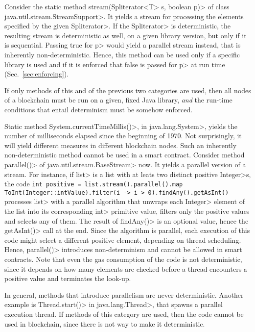 Consider the static method
\<stream(Spliterator$\text{<}$T$\text{>}$ s, boolean p)>
of class \<java.util.stream.StreamSupport>. It
yields a stream for processing the elements specified by
the given \<Spliterator>. If the \<Spliterator> is deterministic,
the resulting stream is deterministic as well,
on a given library version, but only if it is sequential.
Passing true for \<p> would yield a parallel stream instead, that is
inherently non-deterministic.
Hence, this method can be used only if a specific library is used and
if it is enforced that false is passed for \<p> at run time (Sec.~\ref{sec:enforcing}).

If only methods of this and of the previous two categories are used, then
all nodes of a blockchain must be run on a given, fixed Java library, \emph{and}
the run-time conditions that entail determinism must be somehow enforced.

Static method \<System.currentTimeMillis()>, in \<java.lang.System>,
yields the number of milliseconds elapsed since the beginning of 1970.
Not surprisingly, it will yield different measures in different blockchain nodes.
Such an inherently non-deterministic method cannot be used in a smart contract.
Consider method \<parallel()> of \<java.util.stream.BaseStream> now.
It yields a parallel version of a stream. For instance, if \<list> is a list with
at leats two distinct positive \<Integer>s, the code
%
\verb!int positive = list.stream().parallel().map!
\verb!ToInt(Integer::intValue).filter(i -> i > 0).findAny().getAsInt()!
%
processes \<list> with a parallel algorithm
that unwraps each \<Integer> element of the list into its corresponding \<int> primitive value,
filters only the positive values and selects any of them.
The result of \<findAny()> is an optional value, hence the
\<getAsInt()> call at the end. Since the algorithm is
parallel, each execution of this code might select a different
positive element, depending on thread scheduling. Hence, \<parallel()>
introduces non-determinism and
cannot be allowed in smart contracts. Note that even the gas consumption
of the code is not deterministic, since it depends on how many elements
are checked before a thread encounters a positive value and terminates
the look-up.

In general, methods that introduce parallelism are never deterministic.
Another example is \<Thread.start()> in \<java.lang.Thread>, that spawns
a parallel execution thread.
If methods of this category are used, then the code cannot be used in blockchain,
since there is not way to make it deterministic.
